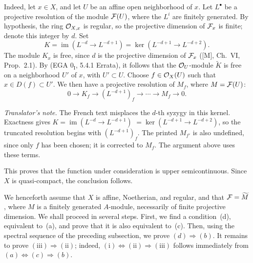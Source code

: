 \setcounter{equation}{1}
\medskip
Indeed, let $x\in X$, and let $U$ be an affine open neighborhood of $x$.
Let $L^\bullet$ be a projective resolution of the module $\cF(U)$, where the
$L^i$ are finitely generated. By hypothesis, the ring $\mathcal O_{X,x}$ is regular,
so the projective dimension of $\cF_x$ is finite; denote this integer by $d$.
Set
\[
  K=\operatorname{im}(L^{-d}\longrightarrow L^{-d+1})=\ker(L^{-d+1}\longrightarrow L^{-d+2}).
\]
The module $K_x$ is free, since $d$ is the projective dimension of $\cF_x$
([M], Ch.~VI, Prop.~2.1). By (EGA $0_{\mathrm I}$, 5.4.1 Errata), it follows
that the $\mathcal O_U$-module $\widetilde K$ is free on a neighborhood $U'$ of $x$,
with $U'\subset U$. Choose $f\in\mathcal O_X(U)$ such that
$x\in D(f)\subset U'$. We then have a projective resolution of $M_f$, where
$M=\cF(U)$:
\[
  0\longrightarrow K_f\longrightarrow (L^{-d+1})_f\longrightarrow
  \cdots\longrightarrow M_f\longrightarrow 0.
\]

\noindent\emph{Translator's note.} The French text misplaces the $d$-th
syzygy in this kernel. Exactness
gives $K=\operatorname{im}(L^{-d}\to L^{-d+1})$
$=\ker(L^{-d+1}\to L^{-d+2})$, so the truncated resolution begins with
$(L^{-d+1})_f$. The printed $M_{f'}$ is also undefined, since only $f$ has
been chosen; it is corrected to $M_f$. The argument above uses these terms.

This proves that the function under consideration is upper semicontinuous.
Since $X$ is quasi-compact, the conclusion follows.


\medskip
We henceforth assume that $X$ is affine, Noetherian, and regular, and that
$\cF=\widetilde M$, where $M$ is a finitely generated $A$-module, necessarily
of finite projective dimension. We shall proceed in several steps. First, we
find a condition~(d), equivalent to~(a), and prove that it is also equivalent
to~(c). Then, using the spectral sequence of the preceding subsection, we
prove $(d)\Rightarrow(b)$. It remains to prove
$(\mathrm{iii})\Rightarrow(\mathrm{ii})$; indeed,
$(\mathrm{i})\Leftrightarrow(\mathrm{ii})\Rightarrow(\mathrm{iii})$ follows
immediately from $(a)\Leftrightarrow(c)\Rightarrow(b)$.

